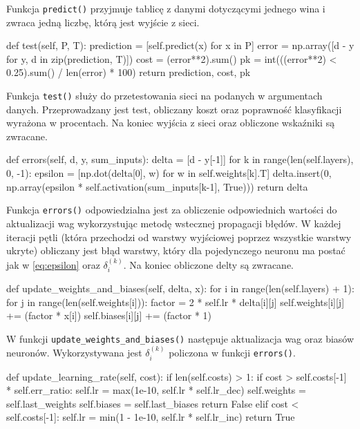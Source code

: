 \documentclass[a4paper,12pt]{article}
\numberwithin{equation}{section}
\begin{document}
\noindent Funkcja \texttt{predict()} przyjmuje tablicę z danymi dotyczącymi jednego wina i zwraca jedną liczbę, którą jest wyjście z sieci.


\begin{pythoncode}
def test(self, P, T):
    prediction = [self.predict(x) for x in P]
    error = np.array([d - y for y, d in zip(prediction, T)])
    cost = (error**2).sum()
    pk = int(((error**2) < 0.25).sum() / len(error) * 100)
    return prediction, cost, pk
\end{pythoncode}

\noindent Funkcja \texttt{test()} służy do przetestowania sieci na podanych w argumentach danych. Przeprowadzany jest test, obliczany koszt oraz poprawność klasyfikacji wyrażona w procentach. Na koniec wyjścia z sieci oraz obliczone wskaźniki są zwracane.


\begin{pythoncode}
def errors(self, d, y, sum_inputs):
    delta = [d - y[-1]]
    for k in range(len(self.layers), 0, -1):
        epsilon = [np.dot(delta[0], w) for w in self.weights[k].T]
        delta.insert(0, np.array(epsilon * self.activation(sum_inputs[k-1], True)))
    return delta
\end{pythoncode}

\noindent Funkcja \texttt{errors()} odpowiedzialna jest za obliczenie odpowiednich wartości do aktualizacji wag wykorzystując metodę wstecznej propagacji błędów. W każdej iteracji pętli (która przechodzi od warstwy wyjściowej poprzez wszystkie warstwy ukryte) obliczany jest błąd warstwy, który dla pojedynczego neuronu ma postać jak w \ref{eq:epsilon} oraz $\delta_i^{(k)}$. Na koniec obliczone delty są zwracane.
    
\begin{pythoncode}
def update_weights_and_biases(self, delta, x):
    for i in range(len(self.layers) + 1):
        for j in range(len(self.weights[i])):
            factor = 2 * self.lr * delta[i][j]
            self.weights[i][j] += (factor * x[i])
            self.biases[i][j] += (factor * 1)
\end{pythoncode}

\noindent W funkcji \texttt{update_weights_and_biases()} następuje aktualizacja wag oraz biasów neuronów. Wykorzystywana jest $\delta_i^{(k)}$ policzona w funkcji \texttt{errors()}.

\begin{pythoncode}
def update_learning_rate(self, cost):
    if len(self.costs) > 1:
        if cost > self.costs[-1] * self.err_ratio:
            self.lr = max(1e-10, self.lr * self.lr_dec)
            self.weights = self.last_weights
            self.biases = self.last_biases
            return False
        elif cost < self.costs[-1]:
            self.lr = min(1 - 1e-10, self.lr * self.lr_inc)
    return True
\end{pythoncode}
\end{document}
